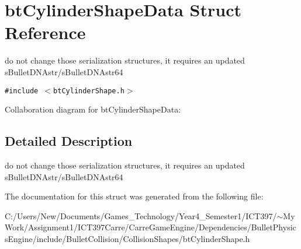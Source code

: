 \hypertarget{structbt_cylinder_shape_data}{
\section{btCylinderShapeData Struct Reference}
\label{structbt_cylinder_shape_data}
}
do not change those serialization structures, it requires an updated sBulletDNAstr/sBulletDNAstr64  


{\tt \#include $<$btCylinderShape.h$>$}

Collaboration diagram for btCylinderShapeData:

\subsection{Detailed Description}
do not change those serialization structures, it requires an updated sBulletDNAstr/sBulletDNAstr64 

The documentation for this struct was generated from the following file:\begin{CompactItemize}
\item 
C:/Users/New/Documents/Games\_\-Technology/Year4\_\-Semester1/ICT397/$\sim$My Work/Assignment1/ICT397Carre/CarreGameEngine/Dependencies/BulletPhysicsEngine/include/BulletCollision/CollisionShapes/btCylinderShape.h\end{CompactItemize}
